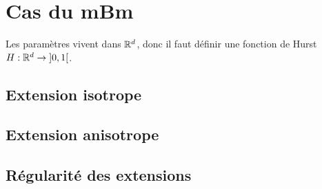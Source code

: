 \section{Cas du mBm}
Les paramètres vivent dans $\mathbb{R}^d$, donc il faut définir une fonction
de Hurst $H:\mathbb{R}^d \to \left]0,1\right[$.
\subsection{Extension isotrope}
\subsection{Extension anisotrope}
\subsection{Régularité des extensions}
